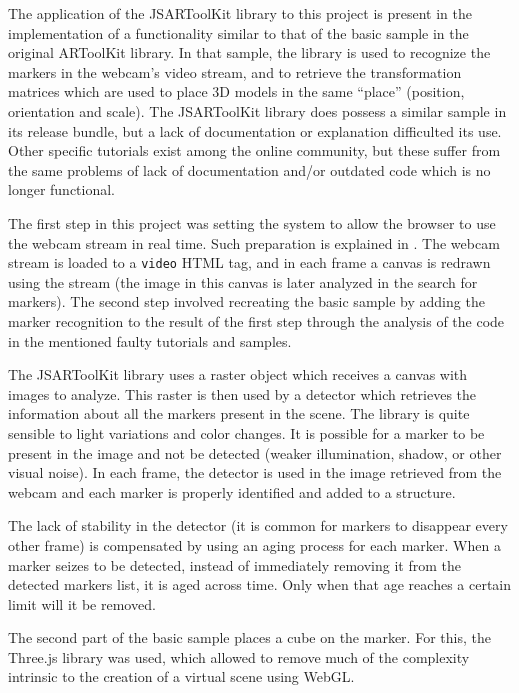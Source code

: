 \label{sec:jsartoolkit}

The application of the JSARToolKit library to this project is present in the implementation of a functionality similar to that of the basic sample in the original ARToolKit library. In that sample, the library is used to recognize the markers in the webcam's video stream, and to retrieve the transformation matrices which are used to place 3D models in the same ``place'' (position, orientation and scale). The JSARToolKit library does possess a similar sample in its release bundle, but a lack of documentation or explanation difficulted its use. Other specific tutorials exist among the online community, but these suffer from the same problems of lack of documentation and/or outdated code which is no longer functional.

The first step in this project was setting the system to allow the browser to use the webcam stream in real time. Such preparation is explained in . The webcam stream is loaded to a \texttt{video} HTML tag, and in each frame a canvas is redrawn using the stream (the image in this canvas is later analyzed in the search for markers). The second step involved recreating the basic sample by adding the marker recognition to the result of the first step through the analysis of the code in the mentioned faulty tutorials and samples.

The JSARToolKit library uses a raster object which receives a canvas with images to analyze. This raster is then used by a detector which retrieves the information about all the markers present in the scene. The library is quite sensible to light variations and color changes. It is possible for a marker to be present in the image and not be detected (weaker illumination, shadow, or other visual noise). In each frame, the detector is used in the image retrieved from the webcam and each marker is properly identified and added to a structure.

The lack of stability in the detector (it is common for markers to disappear every other frame) is compensated by using an aging process for each marker. When a marker seizes to be detected, instead of immediately removing it from the detected markers list, it is aged across time. Only when that age reaches a certain limit will it be removed.

The second part of the basic sample places a cube on the marker. For this, the Three.js library was used, which allowed to remove much of the complexity intrinsic to the creation of a virtual scene using WebGL.


